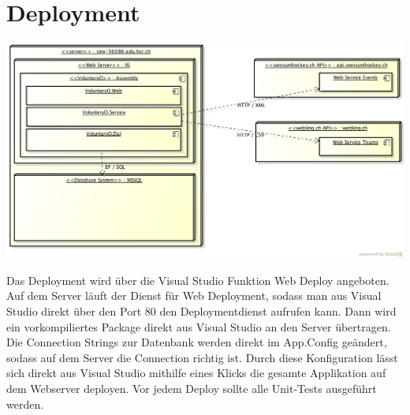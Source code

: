 \chapter{Deployment}
	
	\includegraphics[width=\textwidth]{content/architekturdokumentation/images/deployment.png}

	Das Deployment wird über die Visual Studio Funktion Web Deploy angeboten. Auf dem Server läuft der Dienst für Web Deployment, sodass man aus Visual Studio direkt über den Port 80 den Deploymentdienst aufrufen kann.
	Dann wird ein vorkompiliertes Package direkt aus Visual Studio an den Server übertragen. Die Connection Strings zur Datenbank werden direkt im App.Config geändert, sodass auf dem Server die Connection richtig ist.
	Durch diese Konfiguration lässt sich direkt aus Visual Studio mithilfe eines Klicks die gesamte Applikation auf dem Webserver deployen.
	Vor jedem Deploy sollte alle Unit-Tests ausgeführt werden.